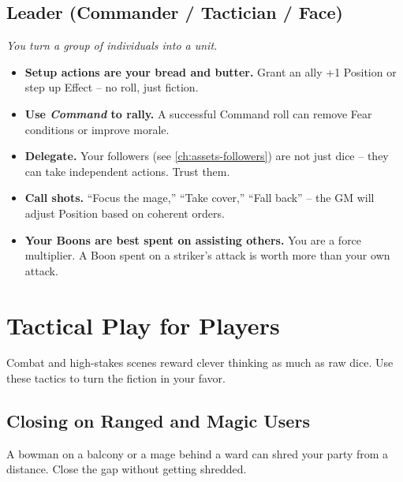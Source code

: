 \subsection{Leader (Commander / Tactician / Face)}
\textit{You turn a group of individuals into a unit.}
\begin{itemize}
  \item \textbf{Setup actions are your bread and butter.} Grant an ally +1 Position or step up Effect -- no roll, just fiction.
  \item \textbf{Use \emph{Command} to rally.} A successful Command roll can remove Fear conditions or improve morale.
  \item \textbf{Delegate.} Your followers (see \ref{ch:assets-followers}) are not just dice -- they can take independent actions. Trust them.
  \item \textbf{Call shots.} ``Focus the mage,'' ``Take cover,'' ``Fall back'' -- the GM will adjust Position based on coherent orders.
  \item \textbf{Your Boons are best spent on assisting others.} You are a force multiplier. A Boon spent on a striker's attack is worth more than your own attack.
\end{itemize}

\section{Tactical Play for Players}
\label{sec:tactical-play}

Combat and high-stakes scenes reward clever thinking as much as raw dice. Use these tactics to turn the fiction in your favor.

\subsection{Closing on Ranged and Magic Users}

A bowman on a balcony or a mage behind a ward can shred your party from a distance. Close the gap without getting shredded.

